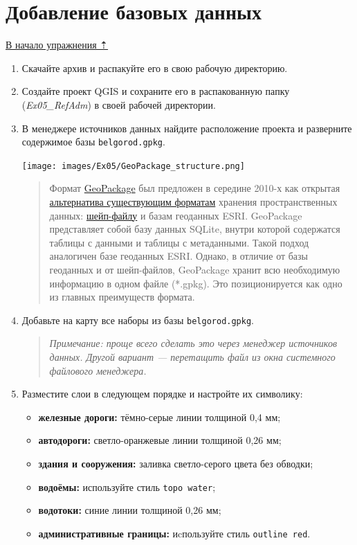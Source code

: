 \documentclass[
  12pt,
]{book}
\providecommand{\tightlist}{%
  \setlength{\itemsep}{0pt}\setlength{\parskip}{0pt}}
\begin{document}
\hypertarget{map-ref-districts-basemap}{%
\section{Добавление базовых данных}\label{map-ref-districts-basemap}}

\protect\hyperlink{map-ref-districts}{В начало упражнения ⇡}

\begin{enumerate}
\def\labelenumi{\arabic{enumi}.}
\item
  Скачайте архив и распакуйте его в свою рабочую директорию.
\item
  Создайте проект QGIS и сохраните его в распакованную папку (\emph{Ex05\_RefAdm}) в своей рабочей директории.
\item
  В менеджере источников данных найдите расположение проекта и разверните содержимое базы \texttt{belgorod.gpkg}.

  \texttt{[image: images/Ex05/GeoPackage\_structure.png]}

  \begin{quote}
  Формат \href{http://www.geopackage.org/}{GeoPackage} был предложен в середине 2010-х как открытая \href{https://imgs.xkcd.com/comics/standards.png}{альтернатива существующим форматам} хранения пространственных данных: \href{http://switchfromshapefile.org/\#shapefileisbad}{шейп-файлу} и базам геоданных ESRI. GeoPackage представляет собой базу данных SQLite, внутри которой содержатся таблицы с данными и таблицы с метаданными. Такой подход аналогичен базе геоданных ESRI. Однако, в отличие от базы геоданных и от шейп-файлов, GeoPackage хранит всю необходимую информацию в одном файле (*.gpkg). Это позиционируется как одно из главных преимуществ формата.
  \end{quote}
\item
  Добавьте на карту все наборы из базы \texttt{belgorod.gpkg}.

  \begin{quote}
  \emph{Примечание: проще всего сделать это через менеджер источников данных. Другой вариант --- перетащить файл из окна системного файлового менеджера.}
  \end{quote}
\item
  Разместите слои в следующем порядке и настройте их символику:

  \begin{itemize}
  \tightlist
  \item
    \textbf{железные дороги:} тёмно-серые линии толщиной 0,4 мм;
  \item
    \textbf{автодороги:} светло-оранжевые линии толщиной 0,26 мм;
  \item
    \textbf{здания и сооружения:} заливка светло-серого цвета без обводки;
  \item
    \textbf{водоёмы:} используйте стиль \texttt{topo\ water};
  \item
    \textbf{водотоки:} синие линии толщиной 0,26 мм;
  \item
    \textbf{административные границы:} иcпользуйте стиль \texttt{outline\ red}.
  \end{itemize}


\end{enumerate}
\end{document}
